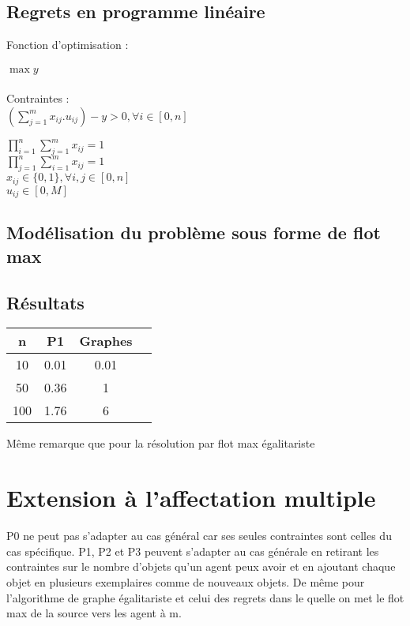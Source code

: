 \documentclass[paper=a4, fontsize=11pt]{scrartcl} %
\numberwithin{equation}{section} %
\numberwithin{figure}{section} %
\numberwithin{table}{section} %
\begin{document}
\subsection{Regrets en programme lin\'eaire}

Fonction d'optimisation : \\\\
$\max y$\\\\
Contraintes :\\

$(\sum_{j=1}^{m}x_{ij}.u_{ij})-y > 0, \forall i \in [0,n]$

$\prod_{i=1}^{n}\sum_{j=1}^{m}x_{ij} = 1$\\
$\prod_{j=1}^{n}\sum_{i=1}^{m}x_{ij} = 1$\\
$x_{ij}\in\{0,1\}, \forall i,j\in[0,n]$\\
$u_{ij}\in[0,M]$


\subsection{Mod\'elisation du probl\`eme sous forme de flot max}


\subsection{R\'esultats}

\begin{tabular}{|*{4}{c|}}
    \hline
     n  & P1  & Graphes\\
    \hline
     10  & 0.01  & 0.01\\
    \hline
     50  & 0.36  & 1\\
    \hline
     100  & 1.76  & 6\\
    \hline
\end{tabular}

M\^eme remarque que pour la r\'esolution par flot max \'egalitariste


\newpage
\section{Extension \`a l'affectation multiple}

P0 ne peut pas s'adapter au cas g\'en\'eral car ses seules contraintes sont celles du cas sp\'ecifique.
P1, P2 et P3 peuvent s'adapter au cas g\'en\'erale en retirant les contraintes sur le nombre d'objets qu'un agent peux avoir et en ajoutant chaque objet en plusieurs exemplaires comme de nouveaux objets.
De même pour l'algorithme de graphe \'egalitariste et celui des regrets dans le quelle on met le flot max de la source vers les agent \`a m.
\end{document}
